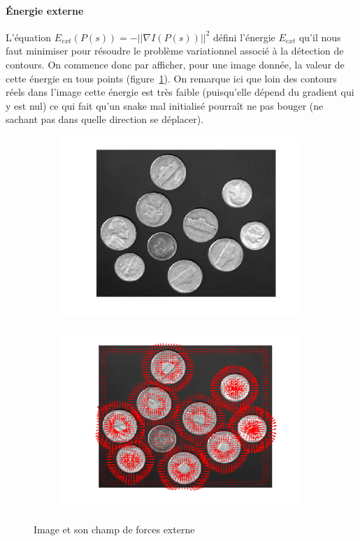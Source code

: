 \documentclass{article}
\begin{document}
\paragraph{Énergie externe}
L'équation $E_{ext}(P(s)) = - ||\nabla I(P(s))||^2$ défini l'énergie $E_{ext}$ qu'il nous faut minimiser pour résoudre le problème variationnel associé à la détection de contours. On commence donc par afficher, pour une image donnée, la valeur de cette énergie en tous points (figure~\ref{7-energie}). On remarque ici que loin des contours réels dans l'image cette énergie est très faible (puisqu'elle dépend du gradient qui y est nul) ce qui fait qu'un snake mal initialisé pourraît ne pas bouger (ne sachant pas dans quelle direction se déplacer).
\begin{figure}[!ht]
    \centering
    \begin{subfigure}[c]{0.49\linewidth}
        \centering
        \includegraphics[width=\linewidth]{images/7-pieces.png}
    \end{subfigure}
    \hfill
    \begin{subfigure}[c]{0.49\linewidth}
        \centering
        \includegraphics[width=\linewidth]{images/7-champ_forces_externe.png}
    \end{subfigure}
    \caption{Image et son champ de forces externe}
    \label{7-energie}
\end{figure}
\end{document}
